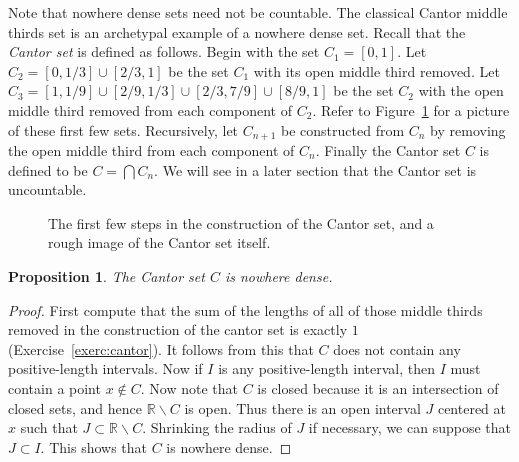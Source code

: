 \documentclass[11pt,oneside]{amsbook}
\newcommand{\RR}{\mathbb R}
\theoremstyle{definition}
\theoremstyle{plain}
\newtheorem{prop}[thm]{Proposition}
\theoremstyle{definition}
\theoremstyle{remark}
\numberwithin{equation}{section}
\numberwithin{figure}{section}
\begin{document}
Note that nowhere dense sets need not be countable. The classical Cantor middle thirds set is an archetypal example of a nowhere dense set. Recall that the \emph{Cantor set} is defined as follows. Begin with the set $C_1=[0,1]$. Let $C_2=[0,1/3]\cup[2/3,1]$ be the set $C_1$ with its open middle third removed. Let $C_3=[1,1/9]\cup[2/9,1/3]\cup[2/3,7/9]\cup[8/9,1]$ be the set $C_2$ with the open middle third removed from each component of $C_2$. Refer to Figure~\ref{fig:cantor-set} for a picture of these first few sets. Recursively, let $C_{n+1}$ be constructed from $C_n$ by removing the open middle third from each component of $C_n$. Finally the Cantor set $C$ is defined to be $C=\bigcap C_n$. We will see in a later section that the Cantor set is uncountable. %

\begin{figure}[h]
\begin{center}
\end{center}
\caption{The first few steps in the construction of the Cantor set, and a rough image of the Cantor set itself.\label{fig:cantor-set}}
\end{figure}

\begin{prop}
  The Cantor set $C$ is nowhere dense.
\end{prop}

\begin{proof}
  First compute that the sum of the lengths of all of those middle thirds removed in the construction of the cantor set is exactly $1$ (Exercise~\ref{exerc:cantor}). It follows from this that $C$ does not contain any positive-length intervals. Now if $I$ is any positive-length interval, then $I$ must contain a point $x\notin C$. Now note that $C$ is closed because it is an intersection of closed sets, and hence $\RR\smallsetminus C$ is open. Thus there is an open interval $J$ centered at $x$ such that $J\subset\RR\smallsetminus C$. Shrinking the radius of $J$ if necessary, we can suppose that $J\subset I$. This shows that $C$ is nowhere dense.
\end{proof}
\end{document}
